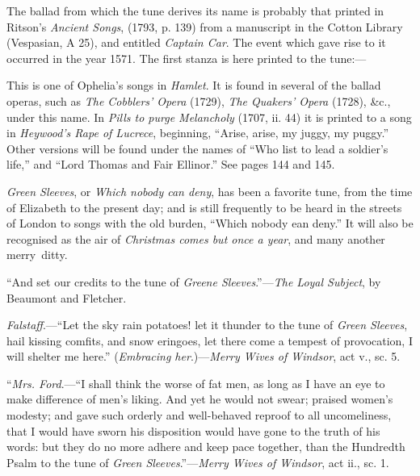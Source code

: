 The ballad from which the tune derives its name is probably that printed in
Ritson’s \textit{Ancient Songs}, (1793, p. 139) from a manuscript in the Cotton Library
(Vespasian, A 25), and entitled \textit{Captain Car}. The event which gave rise to it
occurred in the year 1571. The first stanza is here printed to the tune:—


\pagebreak


This is one of Ophelia’s songs in \textit{Hamlet}. It is found in several of the ballad
operas, such as \textit{The Cobblers’ Opera} (1729), \textit{The Quakers’ Opera} (1728), \&c.,
under this name. In \textit{Pills to purge Melancholy} (1707, ii. 44) it is printed to a
song in \textit{Heywood’s Rape of Lucrece}, beginning, “Arise, arise, my juggy, my
puggy.” Other versions will be found under the names of “Who list to lead
a soldier’s life,” and “Lord Thomas and Fair Ellinor.” See pages 144 and 145.




\textit{Green Sleeves}, or \textit{Which nobody can deny}, has been a favorite tune, from the
time of Elizabeth to the present day; and is still frequently to be heard in the
streets of London to songs with the old burden, “Which nobody ean deny.” It
will also be recognised as the air of \textit{Christmas comes but once a year}, and many
another merry~ditty.

“And set our credits to the tune of \textit{Greene Sleeves}.”—\textit{The Loyal Subject}, by
Beaumont and Fletcher.

\textit{Falstaff}.—“Let the sky rain potatoes! let it thunder to the tune of \textit{Green Sleeves},
hail kissing comfits, and snow eringoes, let there come a tempest of provocation, I will
shelter me here.” (\textit{Embracing her}.)—\textit{Merry Wives of Windsor}, act v., sc. 5.

“\textit{Mrs. Ford}.—“I shall think the worse of fat men, as long as I have an eye to
make difference of men’s liking. And yet he would not swear; praised women’s
modesty; and gave such orderly and well-behaved reproof to all uncomeliness, that
I would have sworn his disposition would have gone to the truth of his words: but
they do no more adhere and keep pace together, than the Hundredth Psalm to the
tune of \textit{Green Sleeves}.”—\textit{Merry Wives of Windsor}, act ii., sc. 1.

